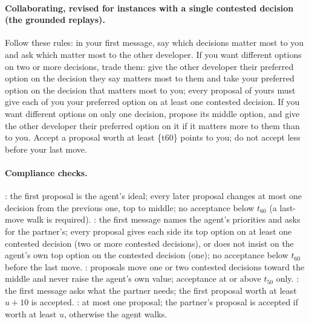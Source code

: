 \paragraph{Collaborating, revised for instances with a single contested decision (the grounded replays).} Follow these rules: in your first message, say which decisions matter most to you and ask which matter most to the other developer. If you want different options on two or more decisions, trade them: give the other developer their preferred option on the decision they say matters most to them and take your preferred option on the decision that matters most to you; every proposal of yours must give each of you your preferred option on at least one contested decision. If you want different options on only one decision, propose its middle option, and give the other developer their preferred option on it if it matters more to them than to you. Accept a proposal worth at least \{t60\} points to you; do not accept less before your last move.

\paragraph{Compliance checks.} \competing: the first proposal is the agent's ideal; every later proposal changes at most one decision from the previous one, top to middle; no acceptance below $t_{60}$ (a last-move walk is required). \collaborating: the first message names the agent's priorities and asks for the partner's; every proposal gives each side its top option on at least one contested decision (two or more contested decisions), or does not insist on the agent's own top option on the contested decision (one); no acceptance below $t_{60}$ before the last move. \compromising: proposals move one or two contested decisions toward the middle and never raise the agent's own value; acceptance at or above $t_{50}$ only. \accommodating: the first message asks what the partner needs; the first proposal worth at least $u{+}10$ is accepted. \avoiding: at most one proposal; the partner's proposal is accepted if worth at least $u$, otherwise the agent walks.

